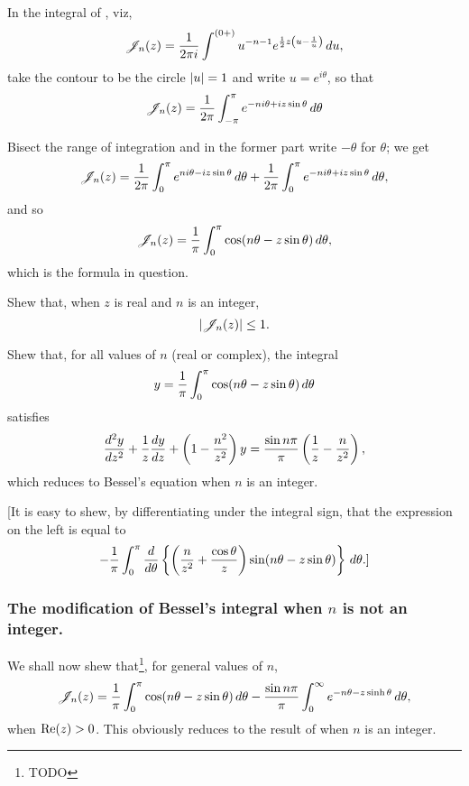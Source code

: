 \documentclass{book}
\begin{document}
In the integral of , viz, 
$$
\mathscr{J}_n(z) 
=
\frac{1}{2\pi i}
\int^{(0+)}
u^{-n-1}
e^{\frac{1}{2} z \left(  u - \frac{1}{u}  \right)}
\, d u,
$$
take the contour to be the circle $\left| u \right| = 1$ and write 
$u = e^{i\theta}$, so that
$$
\mathscr{J}_n(z)
= 
\frac{1}{2\pi}
\int_{-\pi}^{\pi}
e^{-ni\theta + iz\sin\theta}
\, d \theta
$$

Bisect the range of integration and in the former part write 
$-\theta$ for $\theta$; we get
$$
\mathscr{J}_n(z) 
=
\frac{1}{2\pi}
\int_0^{\pi}
e^{n i \theta - i z \sin\theta}
\, d \theta
+
\frac{1}{2\pi}
\int_0^{\pi}
e^{-n i \theta + i z \sin\theta}
\, d \theta,
$$
and so
$$
\mathscr{J}_n(z)
=
\frac{1}{\pi}
\int_0^{\pi}
\cos (n \theta - z \sin \theta)
\, d \theta,
$$
which is the formula in question.
\begin{wandwexample}
  Shew that, when $z$ is real and $n$ is an integer,
  $$
  \left|  \mathscr{J}_n(z)  \right| \leq 1.
  $$
\end{wandwexample}
\begin{wandwexample}
  Shew that, for all values of $n$ (real or complex), the integral
  $$
  y
  =
  \frac{1}{\pi}
  \int_0^{\pi}
  \cos (n \theta - z \sin \theta)
  \, d \theta
  $$
  satisfies
  $$
  \frac{d^2 y}{dz^2}
  +
  \frac{1}{z}
  \frac{dy}{dz}
  +
  \left(  1 - \frac{n^2}{z^2}  \right) y
  =
  \frac{ \sin n\pi }{\pi}
  \left(  \frac{1}{z} - \frac{n}{z^2}   \right),
  $$
  which reduces to Bessel's equation when $n$ is an integer.

[It is easy to shew, by differentiating under the integral sign, that
the expression on the left is equal to
$$
-
\frac{1}{\pi}
\int_0^{\pi}
\frac{d}{d\theta}
\left\{  \left(  \frac{n}{z^2} + \frac{\cos\theta}{z}   \right)
\sin(n\theta - z \sin\theta) \right\}
\, d \theta
.]
$$
\end{wandwexample}
%
\subsubsection{The modification of Bessel's integral when $n$ is not
  an integer.}
We shall now shew that\footnote{TODO}, for general values of $n$,
\begin{equation}
\mathscr{J}_n(z) 
=
\frac{1}{\pi}
\int_0^{\pi} \cos(n\theta - z\sin\theta) \, d\theta
-
\frac{\sin n\pi}{\pi}
\int_0^{\infty} e^{-n\theta - z\sinh\theta} \, d\theta,
\end{equation}
when $\mathrm{Re}(z) > 0$. This obviously reduces to the result of
 when $n$ is an integer.
\end{document}
